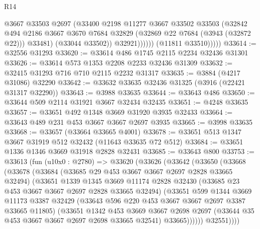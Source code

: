 \begin{lexlean}{R14}
\begin{coremodule}
                        @3667
                        @33503
                        @2697
                        (@33400
                          @2198
                          @11277
                          @3667
                          @33502
                          @33503
                          (@32842
                            @494
                            @2186
                            @3667
                            @3670
                            @7684
                            @32829
                            (@32869 @22 @7684 (@3943 (@32872 @22)))
                            @33481)
                          (@33044 @33502))
                        @32921))))))
            (@11811 @33510)))))
@33614 := @32556 @31293
@33620 := @33614 @486 @1745 @2115 @2234 @32436 @31301
@33626 := @33614 @573 @1353 @2208 @2233 @32436 @31309
@33632 := @32415 @31293 @716 @710 @2115 @2232 @31317
@33635 := @3884 (@4217 @31086) @32290
@33642 := @33632 @33635 @32436 @31325 (@3916 (@22421 @31317 @32290))
@33643 := @3988 @33635
@33644 := @33643 @486
@33650 := @33644 @509 @2114 @31921 @3667 @32434 @32435
@33651 := @4248 @33635
@33657 := @33651 @492 @1348 @3669 @31920 @3935 @32433
@33664 := @33643 @489 @231 @453 @3667 @3667 @2697 @3935
@33665 := @3998 @33635
@33668 := @33657 (@33664 @33665 @4001)
@33678 := @33651 @513 @1347 @3667 @31919 @512 @32432 (@11643 @33635 @72 @512)
@33684 := @33651 @1336 @1346 @3669 @31918 @2828 @32431
@33685 := @33643 @800
@33753 := @33613
    (fun (u10x0 : @2780) =>
    @33620
      (@33626
        (@33642
          (@33650
            (@33668
              (@33678
                (@33684
                  (@33685 @29 @453 @3667 @3667 @2697 @2828 @33665 @32494)
                  (@33651
                    @1339
                    @1345
                    @3669
                    @11174
                    @2828
                    @32430
                    (@33685 @23 @453 @3667 @3667 @2697 @2828 @33665 @32494)
                    (@33651
                      @599
                      @1344
                      @3669
                      @11173
                      @3387
                      @32429
                      (@33643 @596 @220 @453 @3667 @3667 @2697 @3387 @33665 @11805)
                      (@33651
                        @1342
                        @453
                        @3669
                        @3667
                        @2698
                        @2697
                        (@33644 @35 @453 @3667 @3667 @2697 @2698 @33665 @32541)
                        @33665))))))
            @32551))))

\end{coremodule}
\end{lexlean}
